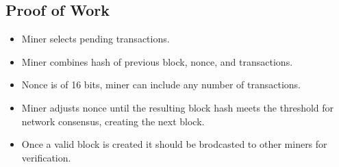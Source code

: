 \documentclass{report}
\begin{document}
\subsection{Proof of Work}
\begin{itemize}
\item Miner selects pending transactions.
\item Miner combines hash of previous block, nonce, and transactions.
\item Nonce is of 16 bits, miner can include any number of transactions.
\item Miner adjusts nonce until the resulting block hash meets the threshold for network consensus, creating the next block.
\item Once a valid block is created it should be brodcasted to other miners for verification.
\end{itemize}
\end{document}
